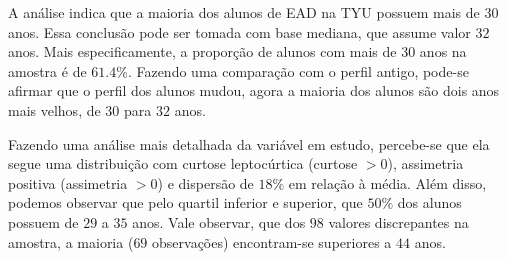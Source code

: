 \documentclass[10pt,a4paper,oneside]{article}
\begin{document}
A análise indica que a maioria dos alunos de EAD na TYU possuem mais de $30$ anos. Essa conclusão pode ser tomada com base mediana, que assume valor $32$ anos. Mais especificamente, a proporção de alunos com mais de 30 anos na amostra é de $61.4\%$. Fazendo uma comparação com o perfil antigo, pode-se afirmar que o perfil dos alunos mudou, agora a maioria dos alunos são dois anos mais velhos, de $30$ para $32$ anos.

Fazendo uma análise mais detalhada da variável em estudo, percebe-se que ela segue uma distribuição com curtose leptocúrtica (curtose $> 0$), assimetria positiva (assimetria $> 0$) e dispersão de $18\%$ em relação à média. Além disso, podemos observar que pelo quartil inferior e superior, que $50\%$  dos alunos possuem de $29$ a $35$ anos. Vale observar, que dos $98$ valores discrepantes na amostra, a maioria ($69$ observações) encontram-se superiores a $44$ anos.
\end{document}
